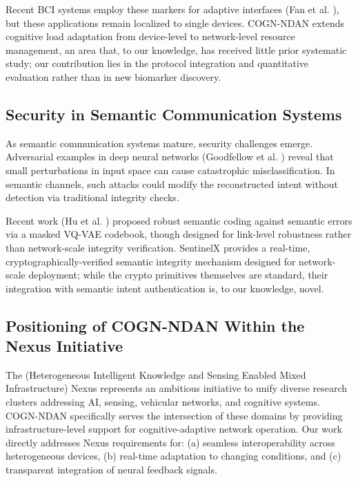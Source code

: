 \documentclass[journal]{IEEEtran}
\newcommand{\COGN}{COGN-NDAN}
\begin{document}
Recent BCI systems employ these markers for adaptive interfaces (Fan et al. \cite{fan2022eegtnet}), but these applications remain localized to single devices. \COGN{} extends cognitive load adaptation from device-level to network-level resource management, an area that, to our knowledge, has received little prior systematic study; our contribution lies in the protocol integration and quantitative evaluation rather than in new biomarker discovery.

\subsection{Security in Semantic Communication Systems}
As semantic communication systems mature, security challenges emerge. Adversarial examples in deep neural networks (Goodfellow et al. \cite{goodfellow2014explaining}) reveal that small perturbations in input space can cause catastrophic misclassification. In semantic channels, such attacks could modify the reconstructed intent without detection via traditional integrity checks.

Recent work (Hu et al. \cite{hu2023robust}) proposed robust semantic coding against semantic errors via a masked VQ-VAE codebook, though designed for link-level robustness rather than network-scale integrity verification. SentinelX provides a real-time, cryptographically-verified semantic integrity mechanism designed for network-scale deployment; while the crypto primitives themselves are standard, their integration with semantic intent authentication is, to our knowledge, novel.

\subsection{Positioning of \COGN{} Within the Nexus Initiative}
The (Heterogeneous Intelligent Knowledge and Sensing Enabled Mixed Infrastructure) Nexus represents an ambitious initiative to unify diverse research clusters addressing AI, sensing, vehicular networks, and cognitive systems. \COGN{} specifically serves the intersection of these domains by providing infrastructure-level support for cognitive-adaptive network operation. Our work directly addresses Nexus requirements for: (a) seamless interoperability across heterogeneous devices, (b) real-time adaptation to changing conditions, and (c) transparent integration of neural feedback signals.
\end{document}
